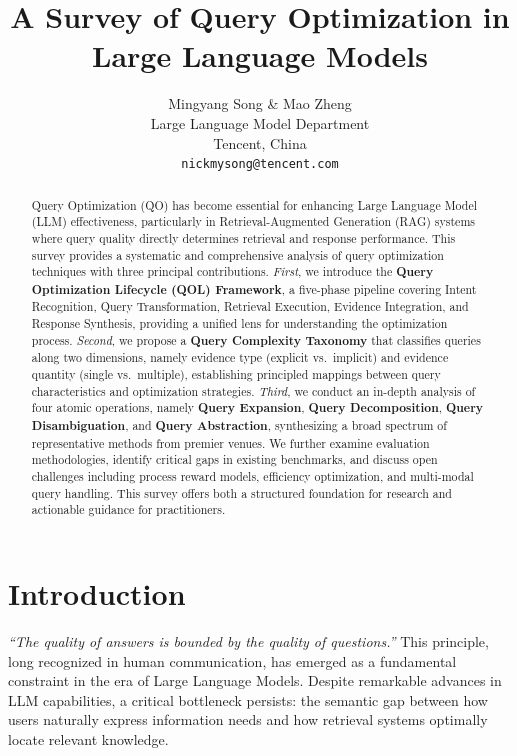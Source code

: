 \documentclass{article}
\title{A Survey of Query Optimization in Large Language Models}
\author{Mingyang Song \& Mao Zheng \\
Large Language Model Department\\ Tencent, China\\
\texttt{nickmysong@tencent.com}}
\begin{document}
\ifcolmsubmission
\linenumbers
\fi

\maketitle

\begin{abstract}
Query Optimization (QO) has become essential for enhancing Large Language Model (LLM) effectiveness, particularly in Retrieval-Augmented Generation (RAG) systems where query quality directly determines retrieval and response performance. This survey provides a systematic and comprehensive analysis of query optimization techniques with three principal contributions. \textit{First}, we introduce the \textbf{Query Optimization Lifecycle (QOL) Framework}, a five-phase pipeline covering Intent Recognition, Query Transformation, Retrieval Execution, Evidence Integration, and Response Synthesis, providing a unified lens for understanding the optimization process. \textit{Second}, we propose a \textbf{Query Complexity Taxonomy} that classifies queries along two dimensions, namely evidence type (explicit vs.\ implicit) and evidence quantity (single vs.\ multiple), establishing principled mappings between query characteristics and optimization strategies. \textit{Third}, we conduct an in-depth analysis of four atomic operations, namely \textbf{Query Expansion}, \textbf{Query Decomposition}, \textbf{Query Disambiguation}, and \textbf{Query Abstraction}, synthesizing a broad spectrum of representative methods from premier venues. We further examine evaluation methodologies, identify critical gaps in existing benchmarks, and discuss open challenges including process reward models, efficiency optimization, and multi-modal query handling. This survey offers both a structured foundation for research and actionable guidance for practitioners.
\end{abstract}

\section{Introduction}

\textit{``The quality of answers is bounded by the quality of questions.''} This principle, long recognized in human communication, has emerged as a fundamental constraint in the era of Large Language Models. Despite remarkable advances in LLM capabilities, a critical bottleneck persists: the semantic gap between how users naturally express information needs and how retrieval systems optimally locate relevant knowledge.
\end{document}
